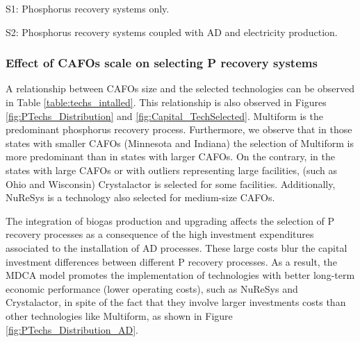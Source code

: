 \begin{refsection}[referencesCh4]
\begin{table}[h]
{\begin{threeparttable}
\begin{tabular}{@{}ccccccccccc@{}}
		\end{tabular}
		\begin{tablenotes}
			\item S1: Phosphorus recovery systems only.
			\item S2: Phosphorus recovery systems coupled with AD and electricity production.
		\end{tablenotes}
	\end{threeparttable}
	}
\end{table}

\subsubsection{Effect of CAFOs scale on selecting P recovery systems}
A relationship between CAFOs size and the selected technologies can be observed in Table \ref{table:techs_intalled}. This relationship is also observed in Figures \ref{fig:PTechs_Distribution} and \ref{fig:Capital_TechSelected}. Multiform is the predominant phosphorus recovery process. Furthermore, we observe that in those states with smaller CAFOs (Minnesota and Indiana) the selection of Multiform is more predominant than in states with larger CAFOs. On the contrary, in the states with large CAFOs or with outliers representing large facilities, (such as Ohio and Wisconsin) Crystalactor is selected for some facilities.
Additionally, NuReSys is a technology also selected for medium-size CAFOs.

The integration of biogas production and upgrading affects the selection of P recovery processes as a consequence of the high investment expenditures associated to the installation of AD processes. These large costs blur the capital investment differences between different P recovery processes. As a result, the MDCA model promotes the implementation of technologies with better long-term economic performance (lower operating costs), such as NuReSys and Crystalactor, in spite of the fact that they involve larger investments costs than other technologies like Multiform, as shown in Figure \ref{fig:PTechs_Distribution_AD}. 


\end{refsection}
